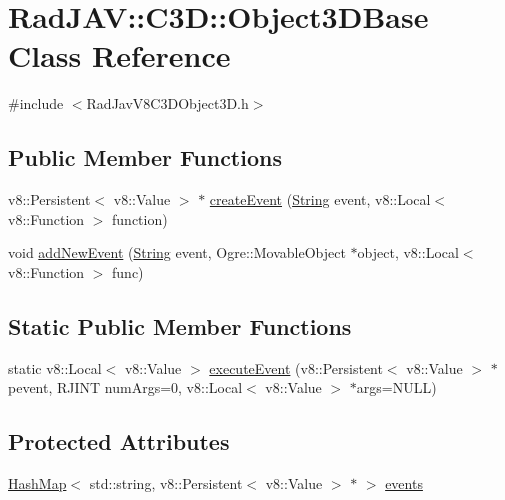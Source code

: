 \hypertarget{class_rad_j_a_v_1_1_c3_d_1_1_object3_d_base}{}\section{Rad\+J\+AV\+:\+:C3D\+:\+:Object3\+D\+Base Class Reference}
\label{class_rad_j_a_v_1_1_c3_d_1_1_object3_d_base}


{\ttfamily \#include $<$Rad\+Jav\+V8\+C3\+D\+Object3\+D.\+h$>$}

\subsection*{Public Member Functions}
\begin{DoxyCompactItemize}
\item 
v8\+::\+Persistent$<$ v8\+::\+Value $>$ $\ast$ \mbox{\hyperlink{class_rad_j_a_v_1_1_c3_d_1_1_object3_d_base_ae65c019baa89111fa96e4322487c609b}{create\+Event}} (\mbox{\hyperlink{class_rad_j_a_v_1_1_string}{String}} event, v8\+::\+Local$<$ v8\+::\+Function $>$ function)
\item 
void \mbox{\hyperlink{class_rad_j_a_v_1_1_c3_d_1_1_object3_d_base_a80619ac6848a546614c9fc45c4f614d0}{add\+New\+Event}} (\mbox{\hyperlink{class_rad_j_a_v_1_1_string}{String}} event, Ogre\+::\+Movable\+Object $\ast$object, v8\+::\+Local$<$ v8\+::\+Function $>$ func)
\end{DoxyCompactItemize}
\subsection*{Static Public Member Functions}
\begin{DoxyCompactItemize}
\item 
static v8\+::\+Local$<$ v8\+::\+Value $>$ \mbox{\hyperlink{class_rad_j_a_v_1_1_c3_d_1_1_object3_d_base_a802e5138705d77e4ceb1e4f02e879fd8}{execute\+Event}} (v8\+::\+Persistent$<$ v8\+::\+Value $>$ $\ast$pevent, R\+J\+I\+NT num\+Args=0, v8\+::\+Local$<$ v8\+::\+Value $>$ $\ast$args=N\+U\+LL)
\end{DoxyCompactItemize}
\subsection*{Protected Attributes}
\begin{DoxyCompactItemize}
\item 
\mbox{\hyperlink{namespace_rad_j_a_v_a7c83af3095bdd8035fd71ff008120f08}{Hash\+Map}}$<$ std\+::string, v8\+::\+Persistent$<$ v8\+::\+Value $>$ $\ast$ $>$ \mbox{\hyperlink{class_rad_j_a_v_1_1_c3_d_1_1_object3_d_base_ae4be8ce97b26fb532dc8051ade916364}{events}}
\end{DoxyCompactItemize}


